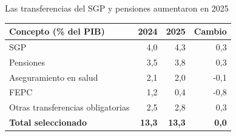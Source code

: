 \begin{frame}{Las transferencias del SGP y pensiones aumentaron en 2025}
\centering
\small
\begin{tabular}{lrrr}
\toprule
\textbf{Concepto (\% del PIB)} & \textbf{2024} & \textbf{2025} & \textbf{Cambio} \\
\midrule
SGP                               & 4,0 & 4,3 &  0,3 \\
Pensiones                         & 3,5 & 3,8 &  0,3 \\
Aseguramiento en salud            & 2,1 & 2,0 & -0,1 \\
FEPC                              & 1,2 & 0,4 & -0,8 \\
Otras transferencias obligatorias & 2,5 & 2,8 &  0,3 \\
\midrule
\textbf{Total seleccionado}       & \textbf{13,3} & \textbf{13,3} & \textbf{0,0} \\
\bottomrule
\end{tabular}
\end{frame}